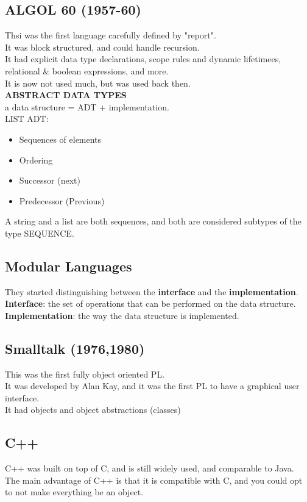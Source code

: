     \subsection{ALGOL 60 (1957-60)}
    Thsi was the first language carefully defined by "report".\\
    It was block structured, and could handle recursion.\\
    It had explicit data type declarations, scope rules and dynamic lifetimees, relational \& boolean expressions, and more.\\
    It is now not used much, but was used back then.\\
    \textbf{ABSTRACT DATA TYPES}\\
    a data structure = ADT + implementation.\\
    LIST ADT: 
    \begin{itemize}
        \item Sequences of elements
        \item Ordering
        \item Successor (next)
        \item Predecessor (Previous)
    \end{itemize}
    A string and a list are both sequences, and both are considered subtypes of the type SEQUENCE.\\
    \subsection{Modular Languages}
    They started distinguishing between the \textbf{interface} and the \textbf{implementation}.\\
    \textbf{Interface}: the set of operations that can be performed on the data structure.\\
    \textbf{Implementation}: the way the data structure is implemented.\\
    \subsection{Smalltalk (1976,1980)}
    This was the first fully object oriented PL.\\
    It was developed by Alan Kay, and it was the first PL to have a graphical user interface.\\
    It had objects and object abstractions (classes)
    \subsection{C++}
    C++ was built on top of C, and is still widely used, and comparable to Java.\\
    The main advantage of C++ is that it is compatible with C, and you could opt to not make everything be an object.\\

